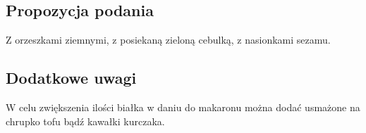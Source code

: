 \vspace{0.5cm}

\small \subsection*{Propozycja podania} Z orzeszkami ziemnymi, z posiekaną zieloną cebulką, z nasionkami sezamu.

\vspace{0.3cm}

\subsection*{Dodatkowe uwagi} W celu zwiększenia ilości białka w daniu do makaronu można dodać usmażone na chrupko tofu bądź kawałki kurczaka.

\newpage
